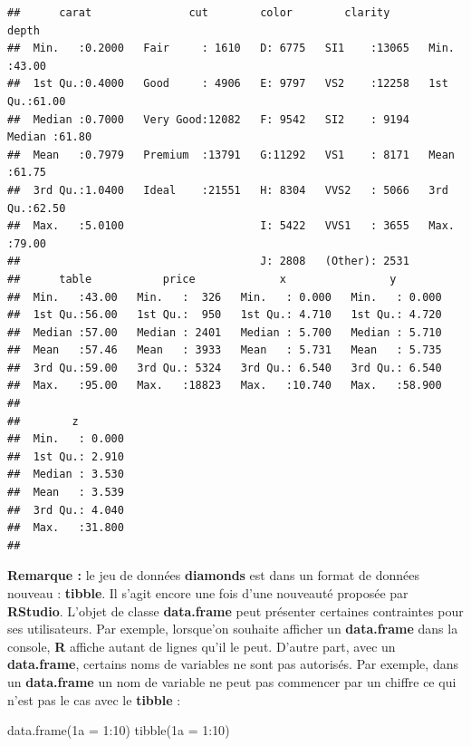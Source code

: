 \documentclass[
]{book}
\newenvironment{Shaded}{\begin{snugshade}}{\end{snugshade}}
\newcommand{\AttributeTok}[1]{\textcolor[rgb]{0.77,0.63,0.00}{#1}}
\newcommand{\DecValTok}[1]{\textcolor[rgb]{0.00,0.00,0.81}{#1}}
\newcommand{\FunctionTok}[1]{\textcolor[rgb]{0.00,0.00,0.00}{#1}}
\newcommand{\NormalTok}[1]{#1}
\newcommand{\OtherTok}[1]{\textcolor[rgb]{0.56,0.35,0.01}{#1}}
\newcommand{\SpecialCharTok}[1]{\textcolor[rgb]{0.00,0.00,0.00}{#1}}
\newcommand{\StringTok}[1]{\textcolor[rgb]{0.31,0.60,0.02}{#1}}
\theoremstyle{definition}
\theoremstyle{definition}
\theoremstyle{definition}
\theoremstyle{definition}
\theoremstyle{remark}
\begin{document}
\begin{verbatim}
##      carat               cut        color        clarity          depth      
##  Min.   :0.2000   Fair     : 1610   D: 6775   SI1    :13065   Min.   :43.00  
##  1st Qu.:0.4000   Good     : 4906   E: 9797   VS2    :12258   1st Qu.:61.00  
##  Median :0.7000   Very Good:12082   F: 9542   SI2    : 9194   Median :61.80  
##  Mean   :0.7979   Premium  :13791   G:11292   VS1    : 8171   Mean   :61.75  
##  3rd Qu.:1.0400   Ideal    :21551   H: 8304   VVS2   : 5066   3rd Qu.:62.50  
##  Max.   :5.0100                     I: 5422   VVS1   : 3655   Max.   :79.00  
##                                     J: 2808   (Other): 2531                  
##      table           price             x                y         
##  Min.   :43.00   Min.   :  326   Min.   : 0.000   Min.   : 0.000  
##  1st Qu.:56.00   1st Qu.:  950   1st Qu.: 4.710   1st Qu.: 4.720  
##  Median :57.00   Median : 2401   Median : 5.700   Median : 5.710  
##  Mean   :57.46   Mean   : 3933   Mean   : 5.731   Mean   : 5.735  
##  3rd Qu.:59.00   3rd Qu.: 5324   3rd Qu.: 6.540   3rd Qu.: 6.540  
##  Max.   :95.00   Max.   :18823   Max.   :10.740   Max.   :58.900  
##                                                                   
##        z         
##  Min.   : 0.000  
##  1st Qu.: 2.910  
##  Median : 3.530  
##  Mean   : 3.539  
##  3rd Qu.: 4.040  
##  Max.   :31.800  
## 
\end{verbatim}

\textbf{Remarque :} le jeu de données \textbf{diamonds} est dans un format de données nouveau : \textbf{tibble}. Il s'agit encore une fois d'une nouveauté proposée par \textbf{RStudio}. L'objet de classe \textbf{data.frame} peut présenter certaines contraintes pour ses utilisateurs. Par exemple, lorsque'on souhaite afficher un \textbf{data.frame} dans la console, \textbf{R} affiche autant de lignes qu'il le peut. D'autre part, avec un \textbf{data.frame}, certains noms de variables ne sont pas autorisés. Par exemple, dans un \textbf{data.frame} un nom de variable ne peut pas commencer par un chiffre ce qui n'est pas le cas avec le \textbf{tibble} :

\begin{Shaded}
\begin{Highlighting}[]
\FunctionTok{data.frame}\NormalTok{(}\StringTok{\textasciigrave{}}\AttributeTok{1a}\StringTok{\textasciigrave{}} \OtherTok{=} \DecValTok{1}\SpecialCharTok{:}\DecValTok{10}\NormalTok{)}
\FunctionTok{tibble}\NormalTok{(}\StringTok{\textasciigrave{}}\AttributeTok{1a}\StringTok{\textasciigrave{}} \OtherTok{=} \DecValTok{1}\SpecialCharTok{:}\DecValTok{10}\NormalTok{)}
\end{Highlighting}
\end{Shaded}
\end{document}

